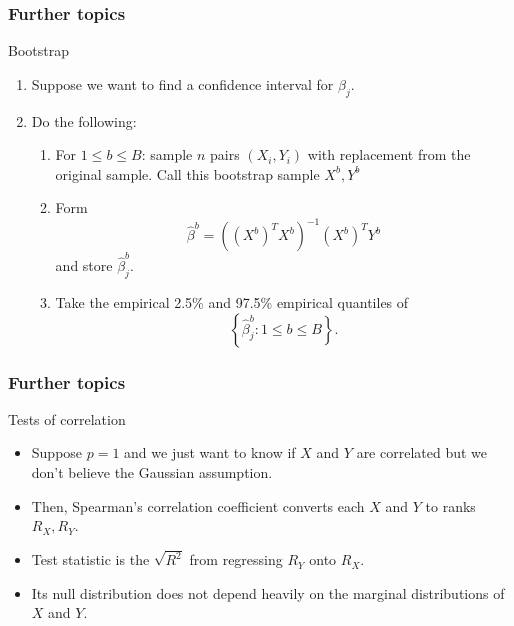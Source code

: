 \documentclass[handout]{beamer}
\begin{document}
   \begin{frame} \frametitle{Further topics}

   \begin{block}
   {Bootstrap}

   \begin{enumerate}
   \item Suppose we want to find a confidence interval
   for $\beta_j$.
   \item Do the following:
   \begin{enumerate}
   \item For $1 \leq b \leq B$: sample
   $n$ pairs $(X_i,Y_i)$ with replacement from
   the original sample. Call this bootstrap sample $X^b, Y^b$
   \item Form
   $$
   \hat{\beta}^b = ((X^b)^TX^b)^{-1} (X^b)^TY^b
   $$
   and store $\hat{\beta}^b_j$.
   \item Take the empirical 2.5\% and 97.5\% empirical quantiles of
   $$
   \left\{\hat{\beta}^b_j: 1 \leq b \leq B\right\}.
   $$
   \end{enumerate}
   \end{enumerate}
   \end{block}
   \end{frame}


   \begin{frame} \frametitle{Further topics}

   \begin{block}
   {Tests of correlation}

   \begin{itemize}
   \item Suppose $p=1$ and we just want to
   know if $X$ and $Y$ are correlated but we don't believe
   the Gaussian assumption.
   \item Then, Spearman's correlation
   coefficient converts each $X$ and $Y$ to ranks
   $R_X, R_Y$.
   \item Test statistic is the $\sqrt{R^2}$ from regressing
   $R_Y$ onto $R_X$.
   \item Its null distribution does not depend heavily
   on the marginal distributions of $X$ and $Y$.
   \end{itemize}
   \end{block}
   \end{frame}

\end{document}
